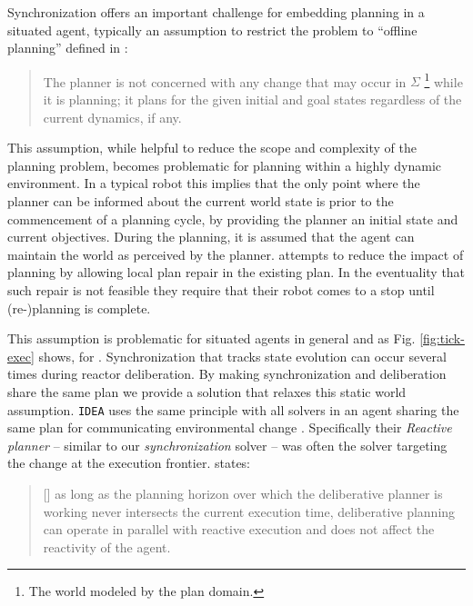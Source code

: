 Synchronization offers an important challenge for embedding planning
in a situated agent, typically an assumption to restrict the problem
to ``offline planning'' defined in \cite{ghallab04}:

{\scriptsize
  \begin{quote}
    The planner is not concerned with any change that may occur in
    $\Sigma$ \footnote{The world modeled by the plan domain.} while it
    is planning; it plans for the given initial and goal states
    regardless of the current dynamics, if any.
\end{quote}}

This assumption, while helpful to reduce the scope and complexity of
the planning problem, becomes problematic for planning within a highly
dynamic environment. In a typical robot this implies that the only
point where the planner can be informed about the current world state
is prior to the commencement of a planning cycle, by providing the
planner an initial state and current objectives. During the planning,
it is assumed that the agent can maintain the world as perceived by
the planner. \cite{lemai04, lemai-chenevier2004} attempts to reduce
the impact of planning by allowing local plan repair in the existing
plan. In the eventuality that such repair is not feasible they require
that their robot comes to a stop until (re-)planning is complete.  

This assumption is problematic for situated agents in general and as
Fig. \ref{fig:tick-exec} shows, for \rxe. Synchronization that tracks
state evolution can occur several times during reactor
deliberation. By making synchronization and deliberation share the
same plan we provide a solution that relaxes this static world
assumption. \texttt{IDEA} uses the same principle with all solvers in
an agent sharing the same plan for communicating environmental change
\cite{Dias:2003ua, mus06}. Specifically their {\em Reactive planner}
-- similar to our {\em synchronization} solver -- was often the solver
targeting the change at the execution frontier. 
\cite{Dias:2003ua} states:

{\scriptsize
  \begin{quote}
  [\textellipsis] as long as the planning horizon over which the
  deliberative planner is working never intersects the current
  execution time, deliberative planning can operate in parallel with
  reactive execution and does not affect the reactivity of the agent. 
\end{quote}}

